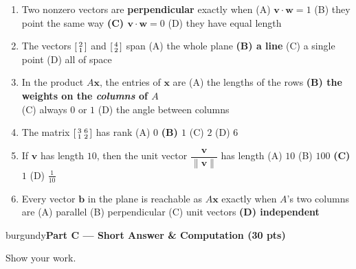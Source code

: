 \documentclass[10pt]{article}
\newcommand{\vv}{\mathbf{v}}
\newcommand{\ww}{\mathbf{w}}
\newcommand{\bb}{\mathbf{b}}
\newcommand{\xx}{\mathbf{x}}
\newcommand{\parthead}[1]{%
  \vspace{6pt}\noindent
  \begin{headlinebox}{burgundy}{\color{white}\bfseries #1}\end{headlinebox}%
  \vspace{4pt}}
\begin{document}
\begin{enumerate}[leftmargin=1.9em, itemsep=9pt]
  \item Two nonzero vectors are \textbf{perpendicular} exactly when
    \hfill (A) $\vv\cdot\ww=1$ \quad (B) they point the same way \quad
    \textbf{(C) $\vv\cdot\ww=0$} \ans{$\leftarrow$} \quad (D) they have equal length
  \item The vectors $\begin{bsmallmatrix}2\\1\end{bsmallmatrix}$ and
    $\begin{bsmallmatrix}4\\2\end{bsmallmatrix}$ span
    \hfill (A) the whole plane \quad \textbf{(B) a line} \ans{$\leftarrow$} \quad (C) a single point \quad (D) all of space
  \item In the product $A\xx$, the entries of $\xx$ are
    \hfill (A) the lengths of the rows \quad \textbf{(B) the weights on the \emph{columns} of $A$} \ans{$\leftarrow$} \\
    \phantom{x}\hfill (C) always $0$ or $1$ \quad (D) the angle between columns
  \item The matrix $\begin{bsmallmatrix}3&6\\1&2\end{bsmallmatrix}$ has rank
    \hfill (A) $0$ \quad \textbf{(B) $1$} \ans{$\leftarrow$} \quad (C) $2$ \quad (D) $6$
  \item If $\vv$ has length $10$, then the unit vector $\dfrac{\vv}{\|\vv\|}$ has length
    \hfill (A) $10$ \quad (B) $100$ \quad \textbf{(C) $1$} \ans{$\leftarrow$} \quad (D) $\tfrac{1}{10}$
  \item Every vector $\bb$ in the plane is reachable as $A\xx$ exactly when $A$'s two columns are
    \hfill (A) parallel \quad (B) perpendicular \quad (C) unit vectors \quad \textbf{(D) independent} \ans{$\leftarrow$}
\end{enumerate}

\boxguard[12]
\parthead{Part C --- Short Answer \& Computation (30 pts)}
Show your work.
\end{document}
